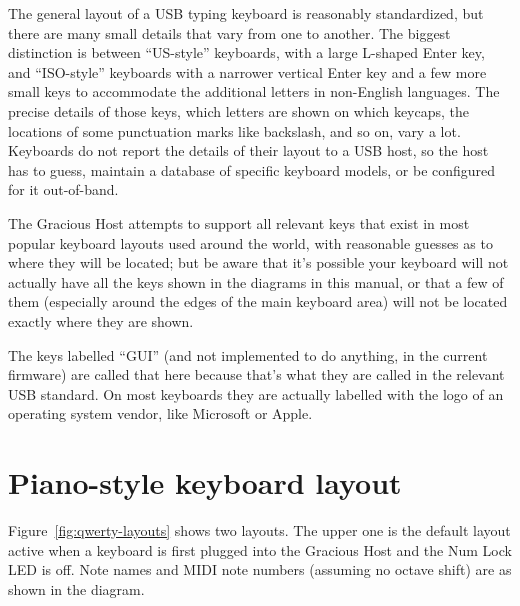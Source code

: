 The general layout of a USB typing keyboard is reasonably standardized, but
there are many small details that vary from one to another.  The biggest
distinction is between ``US-style'' keyboards, with a large L-shaped Enter
key, and ``ISO-style'' keyboards with a narrower vertical Enter key and a
few more small keys to accommodate the additional letters in non-English
languages.  The precise details of those keys, which letters are shown on
which keycaps, the locations of some punctuation marks like backslash, and
so on, vary a lot.  Keyboards do not report the details of their layout to a
USB host, so the host has to guess, maintain a database of specific keyboard
models, or be configured for it out-of-band.

The Gracious Host attempts to support all relevant keys that exist in most
popular keyboard layouts used around the world, with reasonable guesses as
to where they will be located; but be aware that it's possible your keyboard
will not actually have all the keys shown in the diagrams in this manual, or
that a few of them (especially around the edges of the main keyboard area)
will not be located exactly where they are shown.

The keys labelled ``GUI'' (and not implemented to do anything, in
the current firmware) are called that here because that's what they are
called in the relevant USB standard.  On most keyboards they are actually
labelled with the logo of an operating system vendor, like Microsoft or
Apple.


\section{Piano-style keyboard layout}

Figure~\ref{fig:qwerty-layouts} shows two layouts.  The upper one is the
default layout active when a keyboard is first plugged into the Gracious
Host and the Num Lock LED is off.  Note names and MIDI note numbers
(assuming no octave shift) are as shown in the diagram.

